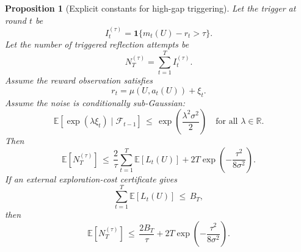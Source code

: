 \documentclass{article} %
\newtheorem{proposition}[theorem]{Proposition}
\begin{document}
\begin{proposition}[Explicit constants for high-gap triggering]
\label{prop:12}
Let the trigger at round \(t\) be
\begin{equation}
\label{eq:app-fifth-trigger-def}
I_t^{(\tau)}
=
\mathbf{1}
\{m_t(U)-r_t>\tau\}.
\end{equation}
Let the number of triggered reflection attempts be
\begin{equation}
\label{eq:app-fifth-trigger-count}
N_T^{(\tau)}
=
\sum_{t=1}^{T} I_t^{(\tau)}.
\end{equation}
Assume the reward observation satisfies
\begin{equation}
\label{eq:app-fifth-reward-noise}
r_t
=
\mu(U,a_t(U))+\xi_t.
\end{equation}
Assume the noise is conditionally sub-Gaussian:
\begin{equation}
\label{eq:app-fifth-subg}
\mathbb{E}\!\left[
\exp(\lambda \xi_t)\mid \mathcal{F}_{t-1}
\right]
\,\le\,
\exp\!\left(\frac{\lambda^2\sigma^2}{2}\right)
\quad
\text{for all }\lambda\in\mathbb{R}.
\end{equation}
Then
\begin{equation}
\label{eq:app-fifth-trigger-bound}
\mathbb{E}\!\left[N_T^{(\tau)}\right]
\,\le\,
\frac{2}{\tau}
\sum_{t=1}^{T}\mathbb{E}[L_t(U)]
+
2T\exp\!\left(-\frac{\tau^2}{8\sigma^2}\right).
\end{equation}
If an external exploration-cost certificate gives
\begin{equation}
\label{eq:app-fifth-trigger-BT-assumption}
\sum_{t=1}^{T}\mathbb{E}[L_t(U)]
\,\le\,
B_T,
\end{equation}
then
\begin{equation}
\label{eq:app-fifth-trigger-BT}
\mathbb{E}\!\left[N_T^{(\tau)}\right]
\,\le\,
\frac{2B_T}{\tau}
+
2T\exp\!\left(-\frac{\tau^2}{8\sigma^2}\right).
\end{equation}
\end{proposition}
\end{document}
